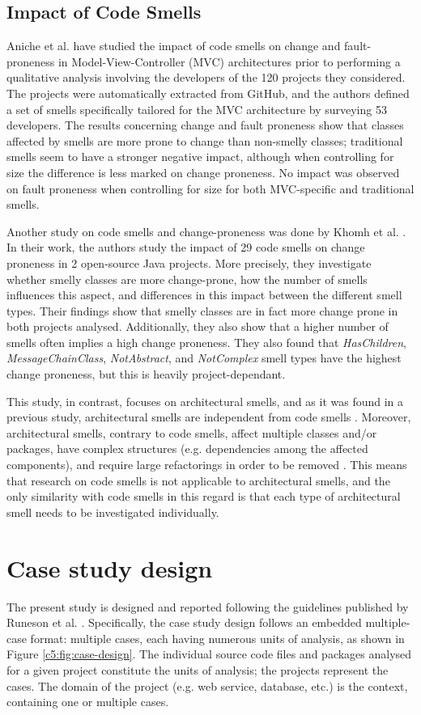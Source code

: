 \subsection{Impact of Code Smells}
Aniche et al. \cite{Aniche2018} have studied the impact of code smells on change and fault-proneness in Model-View-Controller (MVC) architectures prior to performing a qualitative analysis involving the developers of the 120 projects they considered.
The projects were automatically extracted from GitHub, and the authors defined a set of smells specifically tailored for the MVC architecture by surveying 53 developers.
The results concerning change and fault proneness show that classes affected by smells are more prone to change than non-smelly classes; traditional smells seem to have a stronger negative impact, although when controlling for size the difference is less marked on change proneness.
No impact was observed on fault proneness when controlling for size for both MVC-specific and traditional smells.

Another study on code smells and change-proneness was done by Khomh et al. \cite{Khomh2009}. In their work, the authors study the impact of 29 code smells on change proneness in 2 open-source Java projects.
More precisely, they investigate whether smelly classes are more change-prone, how the number of smells influences this aspect, and differences in this impact between the different smell types.
Their findings show that smelly classes are in fact more change prone in both projects analysed. Additionally, they also show that a higher number of smells often implies a high change proneness. They also found that \emph{HasChildren}, \emph{MessageChainClass}, \emph{NotAbstract}, and \emph{NotComplex} smell types have the highest change proneness, but this is heavily project-dependant.

This study, in contrast, focuses on architectural smells, and as it was found in a previous study, architectural smells are independent from code smells \cite{Arcelli2019}.
Moreover, architectural smells, contrary to code smells, affect multiple classes and/or packages, have complex structures (e.g. dependencies among the affected components), and require large refactorings in order to be removed \cite{Lippert2006}.
This means that research on code smells is not applicable to architectural smells, and the only similarity with code smells in this regard is that each type of architectural smell needs to be investigated individually.


\section{Case study design}\label{c5:sec:design}
The present study is designed and reported following the guidelines published by Runeson et al. \cite{Runeson2012}.
Specifically, the case study design follows an embedded multiple-case format: multiple cases, each having numerous units of analysis, as shown in Figure \ref{c5:fig:case-design}.
The individual source code files and packages analysed for a given project constitute the units of analysis; the projects represent the cases.
The domain of the project (e.g. web service, database, etc.) is the context, containing one or multiple cases.

